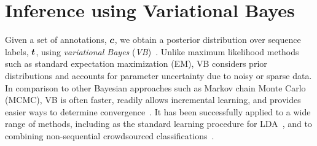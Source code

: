 \section{Inference using Variational Bayes} \label{sec:vb}
 
Given a set of annotations, $\boldsymbol c$, 
we obtain a posterior distribution over 
sequence labels, $\boldsymbol t$, using
\emph{variational Bayes} (\emph{VB})~\cite{attias_advances_2000}.
Unlike maximum likelihood methods such as standard expectation maximization (EM),
VB considers prior distributions 
and accounts for parameter uncertainty due to 
noisy or sparse data.
In comparison to other Bayesian approaches such as Markov chain Monte Carlo (MCMC),
VB is often faster, readily allows incremental learning, and provides easier ways
to determine convergence~\cite{Bishop2006}. 
It has been successfully applied to a wide range of methods,
including as the standard learning procedure for LDA~\cite{blei2003},
and to combining non-sequential crowdsourced classifications~\cite{simpsonlong}.

